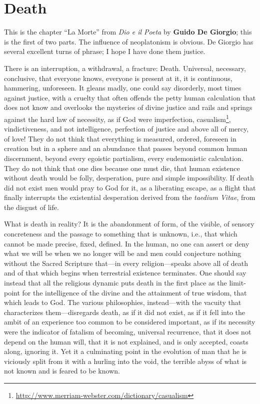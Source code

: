 \section{Death}

\begin{quotex}
This is the chapter ``La Morte'' from \textit{Dio e il Poeta} by \textbf{Guido De Giorgio}; this is the first of two parts. The influence of neoplatonism is obvious. De Giorgio has several excellent turns of phrase; I hope I have done them justice.
\end{quotex}


There is an interruption, a withdrawal, a fracture: Death. Universal, necessary, conclusive, that everyone knows, everyone is present at it, it is continuous, hammering, unforeseen. It gleans madly, one could say disorderly, most times against justice, with a cruelty that often offends the petty human calculation that does not know and overlooks the mysteries of divine justice and rails and springs against the hard law of necessity, as if God were imperfection, casualism\footnote{\url{http://www.merriam-webster.com/dictionary/casualism}}, vindictiveness, and not intelligence, perfection of justice and above all of mercy, of love! They do not think that everything is measured, ordered, foreseen in creation but in a sphere and an abundance that passes beyond common human discernment, beyond every egoistic partialism, every eudemonistic calculation. They do not think that one dies because one must die, that human existence without death would be folly, desperation, pure and simple impossibility. If death did not exist men would pray to God for it, as a liberating escape, as a flight that finally interrupts the existential desperation derived from the \emph{taedium Vitae}, from the disgust of life.


What is death in reality? It is the abandonment of form, of the visible, of sensory concreteness and the passage to something that is unknown, i.e., that which cannot be made precise, fixed, defined. In the human, no one can assert or deny what we will be when we no longer will be and men could conjecture nothing without the Sacred Scripture that---in every religion---speaks above all of death and of that which begins when terrestrial existence terminates. One should say instead that all the religious dynamic puts death in the first place as the limit-point for the intelligence of the divine and the attainment of true wisdom, that which leads to God. The various philosophies, instead---with the vacuity that characterizes them---disregards death, as if it did not exist, as if it fell into the ambit of an experience too common to be considered important, as if its necessity were the indicator of fatalism of becoming, universal recurrence, that it does not depend on the human will, that it is not explained, and is only accepted, coasts along, ignoring it. Yet it a culminating point in the evolution of man that he is viciously split from it with a hurling into the void, the terrible abyss of what is not known and is feared to be known.

